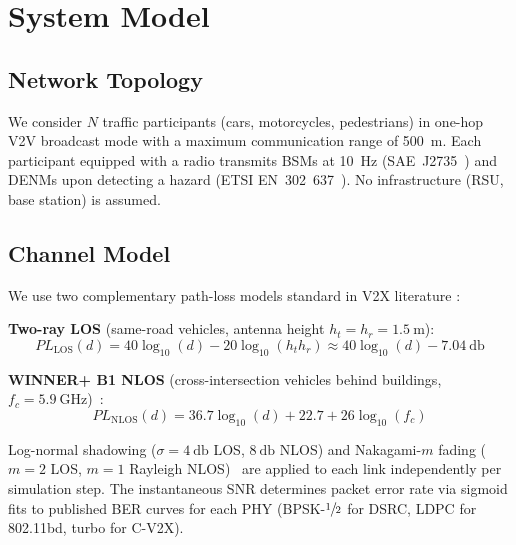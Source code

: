 \documentclass[journal]{IEEEtran}
\begin{document}

\section{System Model}
\label{sec:model}

\subsection{Network Topology}

We consider $N$ traffic participants (cars, motorcycles, pedestrians) in
one-hop V2V broadcast mode with a maximum communication range of
\SI{500}{\metre}.
Each participant equipped with a radio transmits BSMs at 10~Hz
(SAE~J2735~\cite{SAE_J2735_2023}) and DENMs upon detecting a hazard
(ETSI EN~302~637~\cite{ETSI_EN_302_637_3}).
No infrastructure (RSU, base station) is assumed.

\subsection{Channel Model}

We use two complementary path-loss models standard in V2X literature
\cite{ETSI_TR_102_861,Gozalvez2012}:

\textbf{Two-ray LOS} (same-road vehicles, antenna height $h_t = h_r =
\SI{1.5}{\metre}$):
\begin{equation}
  PL_{\text{LOS}}(d) = 40 \log_{10}(d) - 20 \log_{10}(h_t h_r)
                      \approx 40 \log_{10}(d) - \SI{7.04}{\decibel}
  \label{eq:twoway}
\end{equation}

\textbf{WINNER+ B1 NLOS} (cross-intersection vehicles behind buildings,
$f_c = \SI{5.9}{\giga\hertz}$)~\cite{WINNER_Plus_D53}:
\begin{equation}
  PL_{\text{NLOS}}(d) = 36.7 \log_{10}(d) + 22.7 + 26 \log_{10}(f_c)
  \label{eq:winner}
\end{equation}

Log-normal shadowing ($\sigma = \SI{4}{\decibel}$ LOS, $\SI{8}{\decibel}$
NLOS) and Nakagami-$m$ fading ($m{=}2$ LOS, $m{=}1$ Rayleigh
NLOS)~\cite{Nakagami1960,Karedal2009} are applied to each link
independently per simulation step.
The instantaneous SNR determines packet error rate via sigmoid fits to
published BER curves for each PHY (BPSK-$\sfrac{1}{2}$ for DSRC,
LDPC for 802.11bd, turbo for C-V2X).
\end{document}
